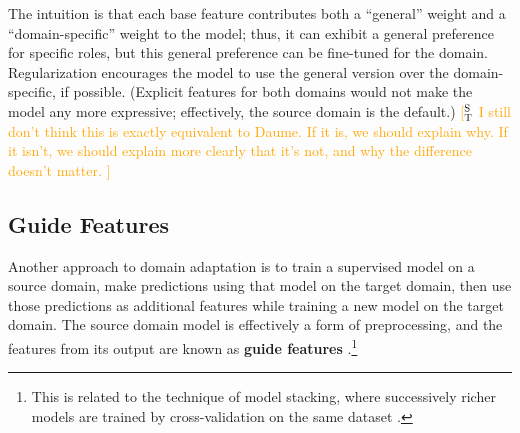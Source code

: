 \documentclass[11pt,a4paper]{article}
\newcommand{\indicator}[1]{I_{\{#1\}}} %
\newcommand{\exemplars}{\mathrm{ex}}
\newcommand{\fulltext}{\mathrm{ft}}
\newcommand{\ensuretext}[1]{#1}
\newcommand{\mkmarker}{\ensuretext{\textcolor{red}{\ensuremath{^{\textsc{M}}_{\textsc{K}}}}}}
\newcommand{\stmarker}{\ensuretext{\textcolor{orange}{\ensuremath{^{\textsc{S}}_{\textsc{T}}}}}}
\newcommand{\nasmarker}{\ensuretext{\textcolor{blue}{\ensuremath{^{\textsc{NA}}_{\textsc{S}}}}}}
\newcommand{\arkcomment}[3]{\ensuretext{\textcolor{#3}{[#1 #2]}}}
\newcommand{\mk}[1]{\arkcomment{\mkmarker}{#1}{red}}
\newcommand{\st}[1]{\arkcomment{\stmarker}{#1}{orange}}
\newcommand{\nascomment}[1]{\arkcomment{\nasmarker}{#1}{blue}}
\begin{document}
%
The intuition is that each base feature contributes both a ``general'' weight and a ``domain-specific'' weight 
to the model; thus, it can exhibit a general preference for specific roles,  
but this general preference can be fine-tuned for the domain.
Regularization encourages the model to use the general version over the domain-specific, if possible.
(Explicit features for both domains would not make the model any more expressive; 
effectively, the source domain is the default.)
\st{
I still don't think this is exactly equivalent to Daume.
If it is, we should explain why.
If it isn't, we should explain more clearly that it's not, and why the
difference doesn't matter.
}

\subsection{Guide Features}
\label{sec:guide}

Another approach to domain adaptation %
is to train a supervised model
on a source domain, make predictions using that
model on the target domain, then use those predictions as additional features
while training a new model on the target domain.
The source domain model is effectively a form of preprocessing, and the features from its output are known as \textbf{guide features} \citep{johansson-13,kong-14}.\footnote{This is related to the technique
of model stacking, where successively richer models are trained by cross-validation on the same dataset 
\citep[e.g.,][]{cohen-05,nivre-08,martins-08}.}
\end{document}
